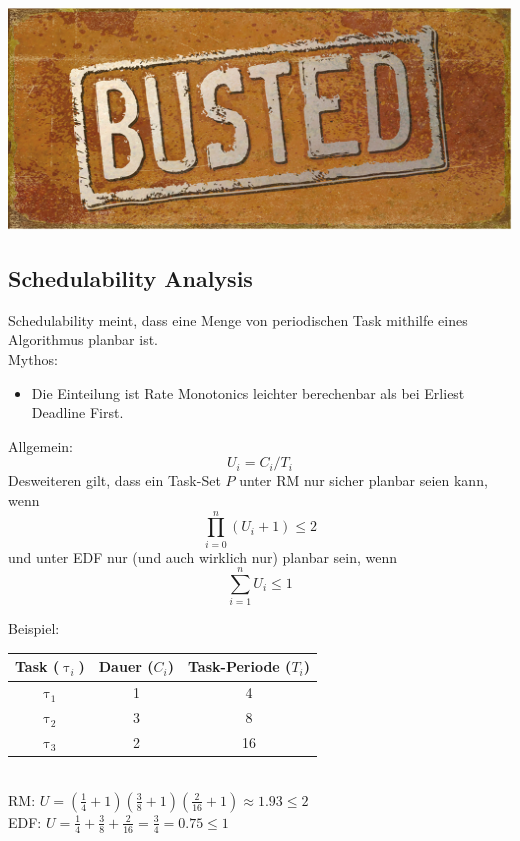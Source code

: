 \begin{frame}{\subsecname}
	\begin{center}
			\includegraphics[scale=1]{graphics/memes/busted.jpg}
	\end{center}
\end{frame}



\subsection{Schedulability Analysis}\label{SchedulabilityAnalaysis}
\begin{frame}{\subsecname}
	Schedulability meint, dass eine Menge von periodischen Task mithilfe eines Algorithmus planbar ist.\\
	Mythos:\pause
	\begin{itemize}
		\item Die Einteilung ist Rate Monotonics leichter berechenbar als bei Erliest Deadline First.
	\end{itemize}
\end{frame}

\begin{frame}{\subsecname}
	Allgemein:
	\begin{equation}
		U_i = C_i / T_i
	\end{equation}
	Desweiteren gilt, dass ein Task-Set $P$ unter RM nur sicher planbar seien kann, wenn
	\begin{equation}
		\prod_{i=0}^n (U_i +1) \leq 2
	\end{equation}
	und unter EDF nur (und auch wirklich nur) planbar sein, wenn
	\begin{equation}
		\sum_{i=1}^n U_i \leq 1
	\end{equation}
\end{frame}

\begin{frame}{\subsecname}
	Beispiel:
	\begin{tabular}{c||c|c}
		Task ($\uptau_i$) & Dauer ($C_i$) & Task-Periode ($T_i$)\\\hline\hline
		$\uptau_1$ & 1 & 4\\
		$\uptau_2$ & 3 & 8\\
		$\uptau_3$ & 2 & 16
	\end{tabular}$ $\\[2ex]
		RM:  $U = (\frac{1}{4}+1)(\frac{3}{8}+1)(\frac{2}{16}+1)\approx 1.93 \leq 2$\\[3ex]
		EDF: $U = \frac{1}{4} + \frac{3}{8} + \frac{2}{16} = \frac{3}{4} = 0.75 \leq 1$
\end{frame}

